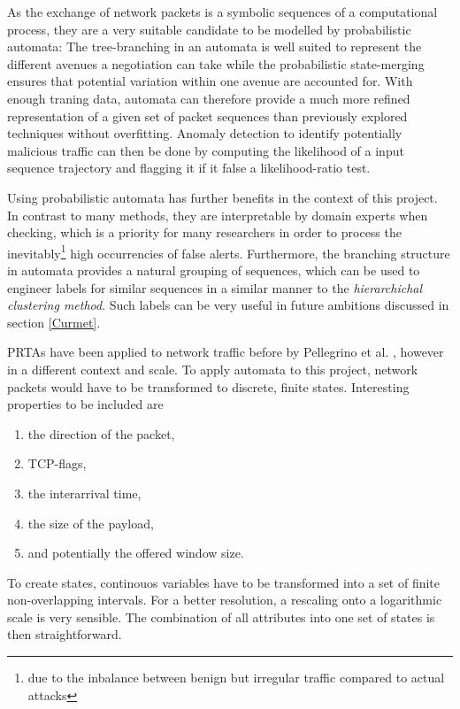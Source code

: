 \documentclass[a4paper,12pt,twoside]{report}
\begin{document}
As the exchange of network packets is a symbolic sequences of a computational process, they are a very suitable candidate to be modelled by probabilistic automata: The tree-branching in an automata is well suited to represent the different avenues a negotiation can take while the probabilistic state-merging ensures that potential variation within one avenue are accounted for. With enough traning data, automata can therefore provide a much more refined representation of a given set of packet sequences than previously explored techniques without overfitting. Anomaly detection to identify potentially malicious traffic can then be done by computing the likelihood of a input sequence trajectory and flagging it if it false a likelihood-ratio test. 

Using probabilistic automata has further benefits in the context of this project. In contrast to many methods, they are interpretable by domain experts when checking, which is a priority for many researchers in order to process the inevitably\footnote{due to the inbalance between benign but irregular traffic compared to actual attacks} high occurrencies of false alerts. Furthermore, the branching structure in automata provides a natural grouping of sequences, which can be used to engineer labels for similar sequences in a similar manner to the \textit{hierarchichal clustering method}. Such labels can be very useful in future ambitions discussed in section \ref{Curmet}.

PRTAs have been applied to network traffic before by Pellegrino et al. \cite{pellegrino2017learning}, however in a different context and scale. To apply automata to this project, network packets would have to be transformed to discrete, finite states. Interesting properties to be included are 

\begin{enumerate}
\item the direction of the packet,
\item TCP-flags,
\item the interarrival time,
\item the size of the payload,
\item and potentially the offered window size.
\end{enumerate}

To create states, continouos variables have to be transformed into a set of finite non-overlapping intervals. For a better resolution, a rescaling onto a logarithmic scale is very sensible. The combination of all attributes into one set of states is then straightforward. 
\end{document}
